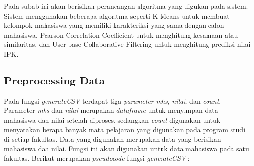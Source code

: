 Pada subab ini akan berisikan perancangan algoritma yang digukan pada sistem. Sistem menggunakan beberapa algoritma seperti K-Means untuk membuat kelompok mahasiswa yang memiliki karakteriksi yang sama dengan calon mahasiswa, Pearson Correlation Coefficient untuk menghitung kesamaan atau similaritas, dan User-base Collaborative Filtering untuk menghitung prediksi nilai IPK.

\subsection{Preprocessing Data}
\label{subsec:perancangan preprocessing data}

Pada fungsi \textit{generateCSV} terdapat tiga \textit{parameter} \textit{mhs}, \textit{nilai}, dan \textit{count}. Parameter \textit{mhs} dan \textit{nilai} merupakan \textit{dataframe} untuk menyimpan data mahasiswa dan nilai setelah diproses, sedangkan \textit{count} digunakan untuk menyatakan berapa banyak mata pelajaran yang digunakan pada program studi di setiap fakultas. Data yang digunakan merupakan data yang berisikan mahasiswa dan nilai. Fungsi ini akan digunakan untuk data mahasiswa pada satu fakultas. Berikut merupakan \textit{pseudocode} fungsi \textit{generateCSV} : 

